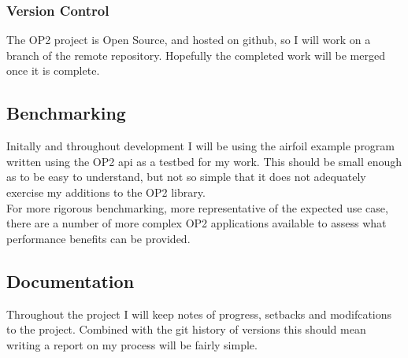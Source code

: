 \documentclass[11pt]{article}
\begin{document}
\subsubsection*{Version Control}
The OP2 project is Open Source, and hosted on github\cite{github}, so I will work on a branch of the remote repository. Hopefully the completed work will be merged once it is complete.
\subsection*{Benchmarking}
Initally and throughout development I will be using the airfoil\cite{airfoil} example program written using the OP2 api as a testbed for my work. This should be small enough as to be easy to understand, but not so simple that it does not adequately exercise my additions to the OP2 library.\\
For more rigorous benchmarking, more representative of the expected use case, there are a number of more complex OP2 applications available to assess what performance benefits can be provided.
\subsection*{Documentation}
Throughout the project I will keep notes of progress, setbacks and modifcations to the project. Combined with the git history of versions this should mean writing a report on my process will be fairly simple.
\end{document}
